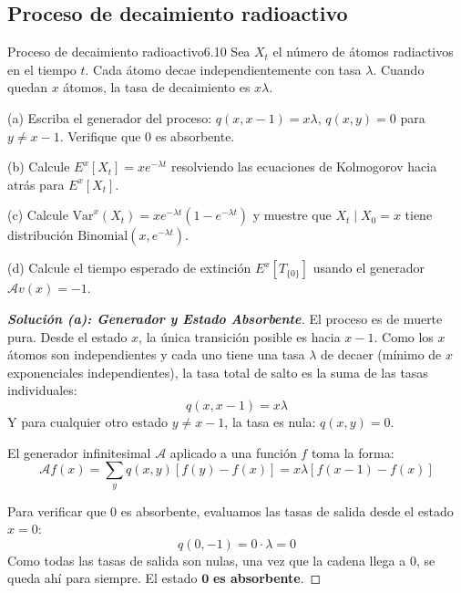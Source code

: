\documentclass[10pt,a4paper]{article}
\begin{document}
\newpage

\subsection{Proceso de decaimiento radioactivo}

\vspace{5mm}

\begin{ejercicio}{Proceso de decaimiento radioactivo}{6.10}
    Sea $X_t$ el número de átomos radiactivos en el tiempo $t$. Cada átomo decae independientemente con tasa $\lambda$. Cuando quedan $x$ átomos, la tasa de decaimiento es $x\lambda$.
    
    (a) Escriba el generador del proceso: $q(x, x-1) = x\lambda$, $q(x, y) = 0$ para $y \neq x-1$. Verifique que 0 es absorbente.
    
    (b) Calcule $E^x[X_t] = x e^{-\lambda t}$ resolviendo las ecuaciones de Kolmogorov hacia atrás para $E^x[X_t]$.
    
    (c) Calcule $\text{Var}^x(X_t) = x e^{-\lambda t}(1 - e^{-\lambda t})$ y muestre que $X_t \mid X_0 = x$ tiene distribución $\text{Binomial}(x, e^{-\lambda t})$.
    
    (d) Calcule el tiempo esperado de extinción $E^x[T_{\{0\}}]$ usando el generador $\mathcal{A}v(x) = -1$.
\end{ejercicio}

\vspace{2mm}

\begin{proof}[\textbf{Solución (a): Generador y Estado Absorbente}]
    El proceso es de muerte pura. Desde el estado $x$, la única transición posible es hacia $x-1$. Como los $x$ átomos son independientes y cada uno tiene una tasa $\lambda$ de decaer (mínimo de $x$ exponenciales independientes), la tasa total de salto es la suma de las tasas individuales:
    \[ q(x, x-1) = x\lambda \]
    Y para cualquier otro estado $y \neq x-1$, la tasa es nula: $q(x,y) = 0$.
    
    El generador infinitesimal $\mathcal{A}$ aplicado a una función $f$ toma la forma:
    \[ \mathcal{A}f(x) = \sum_{y} q(x,y) [f(y) - f(x)] = x\lambda [f(x-1) - f(x)] \]
    
    Para verificar que $0$ es absorbente, evaluamos las tasas de salida desde el estado $x=0$:
    \[ q(0, -1) = 0 \cdot \lambda = 0 \]
    Como todas las tasas de salida son nulas, una vez que la cadena llega a $0$, se queda ahí para siempre. El estado $\mathbf{0}$ \textbf{es absorbente}.
\end{proof}
\end{document}
